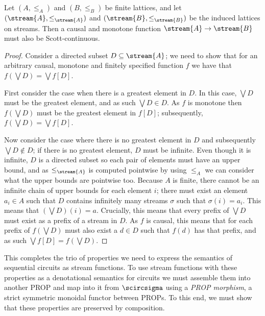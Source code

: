 \begin{proposition}\label{prop:monotone-causal-scott}
    Let \((A, \leq_A)\) and \((B, \leq_B)\) be finite lattices, and let
    \((\stream{A}, \leq_{\stream{A}})\) and \((\stream{B}, \leq_{\stream{B}})\)
    be the induced lattices on streams.
    Then a causal and monotone function \(\stream{A} \to \stream{B}\) must also
    be Scott-continuous.
\end{proposition}
\begin{proof}
    Consider a directed subset \(D \subseteq \stream{A}\); we need to show that
    for an arbitrary causal, monotone and finitely specified function \(f\) we
    have that \(f\left(\bigvee D\right) = \bigvee f[D]\).

    First consider the case when there is a greatest element in \(D\).
    In this case, \(\bigvee D\) must be the greatest element, and as such
    \(\bigvee D \in D\).
    As \(f\) is monotone then \(f(\bigvee D)\) must be the greatest element in
    \(f[D]\); subsequently, \(f\left(\bigvee D\right) = \bigvee f[D]\).

    Now consider the case where there is no greatest element in \(D\) and
    subsequently \(\bigvee D \not\in D\); if there is no greatest element,
    \(D\) must be infinite.
    Even though it is infinite, \(D\) is a directed subset so each pair of
    elements must have an upper bound, and as \(\leq_{\stream{A}}\) is computed
    pointwise by using \(\leq_A\) we can consider what the upper bounds are
    pointwise too.
    Because \(A\) is finite, there cannot be an infinite chain of upper bounds
    for each element \(i\); there must exist an element \(a_i \in A\) such that
    \(D\) contains infinitely many streams \(\sigma\) such that
    \(\sigma(i) = a_i\).
    This means that \(\left(\bigvee D\right)(i) = a\).
    Crucially, this means that every prefix of \(\bigvee D\) must exist as a
    prefix of a stream in \(D\).
    As \(f\) is causal, this means that for each prefix of
    \(f\left(\bigvee D\right)\) must also exist a \(d \in D\) such that
    \(f(d)\) has that prefix, and as such
    \(\bigvee f[D] = f\left(\bigvee D\right)\).
\end{proof}

This completes the trio of properties we need to express the semantics of
sequential circuits as stream functions.
To use stream functions with these properties as a denotational semantics for
circuits we must assemble them into another PROP and map into it from
\(\scircsigma\) using a \emph{PROP morphism}, a strict symmetric monoidal
functor between PROPs.
To this end, we must show that these properties are preserved by composition.

